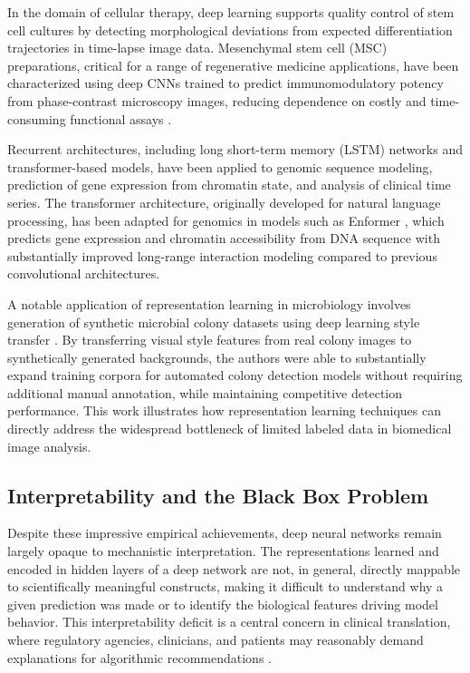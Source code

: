 In the domain of cellular therapy, deep learning supports quality control of stem cell cultures by detecting morphological deviations from expected differentiation trajectories in time-lapse image data. Mesenchymal stem cell (MSC) preparations, critical for a range of regenerative medicine applications, have been characterized using deep CNNs trained to predict immunomodulatory potency from phase-contrast microscopy images, reducing dependence on costly and time-consuming functional assays \parencite{kusumoto2021}.

Recurrent architectures, including long short-term memory (LSTM) networks and transformer-based models, have been applied to genomic sequence modeling, prediction of gene expression from chromatin state, and analysis of clinical time series. The transformer architecture, originally developed for natural language processing, has been adapted for genomics in models such as Enformer \parencite{avsec2021}, which predicts gene expression and chromatin accessibility from DNA sequence with substantially improved long-range interaction modeling compared to previous convolutional architectures.

A notable application of representation learning in microbiology involves generation of synthetic microbial colony datasets using deep learning style transfer \parencite{pawlowski2022}. By transferring visual style features from real colony images to synthetically generated backgrounds, the authors were able to substantially expand training corpora for automated colony detection models without requiring additional manual annotation, while maintaining competitive detection performance. This work illustrates how representation learning techniques can directly address the widespread bottleneck of limited labeled data in biomedical image analysis.

\subsection{Interpretability and the Black Box Problem}

Despite these impressive empirical achievements, deep neural networks remain largely opaque to mechanistic interpretation. The representations learned and encoded in hidden layers of a deep network are not, in general, directly mappable to scientifically meaningful constructs, making it difficult to understand why a given prediction was made or to identify the biological features driving model behavior. This interpretability deficit is a central concern in clinical translation, where regulatory agencies, clinicians, and patients may reasonably demand explanations for algorithmic recommendations \parencite{rudin2019}.

